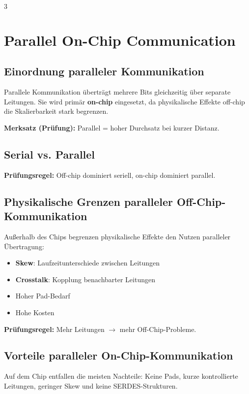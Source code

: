\documentclass[10pt,a4paper]{article}
\newcommand{\hilite}[1]{\colorbox{yellow!25}{#1}}
\newcommand{\imp}[1]{\textbf{\textcolor{codeemph}{#1}}}
\begin{document}
\begin{multicols}{3}
\section{Parallel On-Chip Communication}

\subsection{Einordnung paralleler Kommunikation}
Parallele Kommunikation überträgt mehrere Bits gleichzeitig über separate Leitungen.  
Sie wird primär \textbf{on-chip} eingesetzt, da physikalische Effekte off-chip die Skalierbarkeit stark begrenzen.

\imp{Merksatz (Prüfung):}  
\hilite{Parallel} = \hilite{hoher} \hilite{Durchsatz} bei kurzer Distanz.

\subsection{Serial vs. Parallel}
\imp{Prüfungsregel:}  
\hilite{Off-chip} \hilite{dominiert} \hilite{seriell}, on-chip dominiert parallel.

\subsection{Physikalische Grenzen paralleler Off-Chip-Kommunikation}
Außerhalb des Chips begrenzen physikalische Effekte den Nutzen paralleler Übertragung:

\begin{itemize}
  \item \textbf{Skew}: Laufzeitunterschiede zwischen Leitungen
  \item \textbf{Crosstalk}: Kopplung benachbarter Leitungen
  \item Hoher Pad-Bedarf
  \item Hohe Kosten
\end{itemize}

\imp{Prüfungsregel:}  
\hilite{Mehr} \hilite{Leitungen} $\rightarrow$ \hilite{mehr} Off-Chip-Probleme.

\subsection{Vorteile paralleler On-Chip-Kommunikation}
Auf dem Chip entfallen die meisten Nachteile: Keine Pads, kurze kontrollierte Leitungen, geringer Skew und keine SERDES-Strukturen.


\end{multicols}
\end{document}
